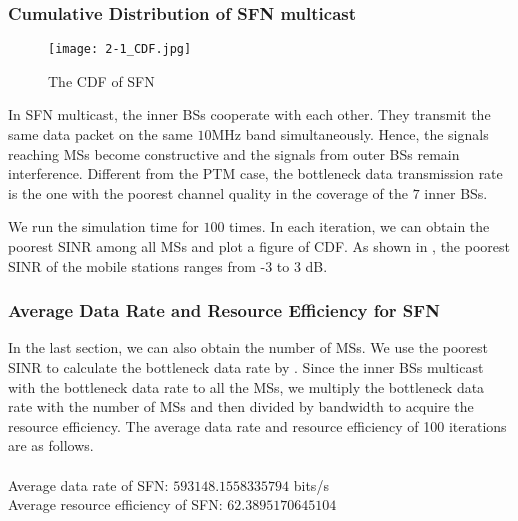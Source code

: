 \documentclass[conference]{IEEEtran}
\begin{document}
\subsubsection{Cumulative Distribution of SFN multicast}

\begin{figure}[htbp]
    \centering
    \texttt{[image: 2-1\_CDF.jpg]}
    \caption{The CDF of SFN}
    \label{fig:SFN_CDF}
\end{figure}
In SFN multicast, the inner BSs cooperate with each other. They transmit the
same data packet on the same $10$MHz band simultaneously. Hence, the signals reaching MSs become constructive and the signals from outer BSs remain interference. Different from the PTM case, the bottleneck data transmission rate is the one with the poorest channel quality in the coverage of the $7$ inner BSs.

We run the simulation time for $100$ times. In each iteration, we can obtain the poorest SINR among all MSs and plot a figure of CDF. As shown in , the poorest SINR of the mobile stations ranges from -3 to 3 dB.
\subsubsection{Average Data Rate and Resource Efficiency for SFN}
In the last section, we can also obtain the number of MSs. We use the poorest SINR to calculate the bottleneck data rate by . Since the inner BSs multicast with the bottleneck data rate to all the MSs, we multiply the bottleneck data rate with the number of MSs and then divided by bandwidth to acquire the resource efficiency. The average data rate and resource efficiency of 100 iterations are as follows.
\\
\\
Average data rate of SFN: $593148.1558335794$ bits/s\\
Average resource efficiency of SFN: $62.3895170645104$
\end{document}

